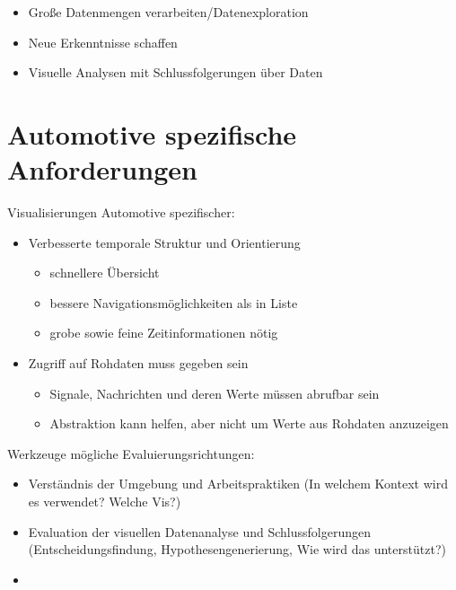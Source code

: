 \documentclass[draft=false
              ,paper=a4
              ,twoside=false
              ,fontsize=11pt
              ,headsepline
              ,BCOR10mm
              ,DIV11
              ]{scrbook}
\newcommand{\TODO}[1]{\colorbox{yellow}{\textcolor{red}{[TODO: #1]}}}
\begin{document}
\begin{itemize}
  \item Große Datenmengen verarbeiten/Datenexploration 
  \item Neue Erkenntnisse schaffen
  \item Visuelle Analysen mit Schlussfolgerungen über Daten
\end{itemize}
%


\section{Automotive spezifische Anforderungen} %
\label{sec:automotive_spezifische_anforderungen}
Visualisierungen Automotive spezifischer:

\begin{itemize}
  \item Verbesserte temporale Struktur und Orientierung
    \begin{itemize}
    \item schnellere Übersicht
    \item bessere Navigationsmöglichkeiten als in Liste
    \item grobe sowie feine Zeitinformationen nötig
  \end{itemize}
  \item Zugriff auf Rohdaten muss gegeben sein
  \begin{itemize}
    \item Signale, Nachrichten und deren Werte müssen abrufbar sein
    \item Abstraktion kann helfen, aber nicht um Werte aus Rohdaten anzuzeigen
  \end{itemize}
\end{itemize}

Werkzeuge mögliche Evaluierungsrichtungen:

\begin{itemize}
  \item Verständnis der Umgebung und Arbeitspraktiken (In welchem Kontext wird es verwendet? Welche Vis?)
  \item Evaluation der visuellen Datenanalyse und Schlussfolgerungen (Entscheidungsfindung, Hypothesengenerierung, Wie wird das unterstützt?)
  \item 
\end{itemize}
\end{document}
